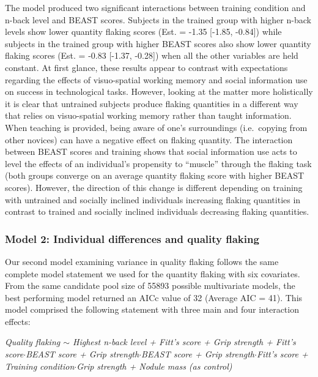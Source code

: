 \documentclass[smallextended]{svjour3}       %
\begin{document}
The model produced two significant interactions between training
condition and n-back level and BEAST scores. Subjects in the trained
group with higher n-back levels show lower quantity flaking scores (Est.
= -1.35 {[}-1.85, -0.84{]}) while subjects in the trained group with
higher BEAST scores also show lower quantity flaking scores (Est. =
-0.83 {[}-1.37, -0.28{]}) when all the other variables are held
constant. At first glance, these results appear to contrast with
expectations regarding the effects of visuo-spatial working memory and
social information use on success in technological tasks. However,
looking at the matter more holistically it is clear that untrained
subjects produce flaking quantities in a different way that relies on
visuo-spatial working memory rather than taught information. When
teaching is provided, being aware of one's surroundings (i.e.~copying
from other novices) can have a negative effect on flaking quantity. The
interaction between BEAST scores and training shows that social
information use acts to level the effects of an individual's propensity
to ``muscle'' through the flaking task (both groups converge on an
average quantity flaking score with higher BEAST scores). However, the
direction of this change is different depending on training with
untrained and socially inclined individuals increasing flaking
quantities in contrast to trained and socially inclined individuals
decreasing flaking quantities.

\hypertarget{model-2-individual-differences-and-quality-flaking}{%
\subsubsection{\texorpdfstring{\textbf{Model 2: Individual differences
and quality
flaking}}{Model 2: Individual differences and quality flaking}}\label{model-2-individual-differences-and-quality-flaking}}

Our second model examining variance in quality flaking follows the same
complete model statement we used for the quantity flaking with six
covariates. From the same candidate pool size of 55893 possible
multivariate models, the best performing model returned an AICc value of
32 (Average AIC = 41). This model comprised the following statement with
three main and four interaction effects:

\emph{Quality flaking \(\sim\) Highest n-back level + Fitt's score +
Grip strength + Fitt's score\(\cdot\)BEAST score + Grip
strength\(\cdot\)BEAST score + Grip strength\(\cdot\)Fitt's score +
Training condition\(\cdot\)Grip strength + Nodule mass (as control)}
\end{document}
